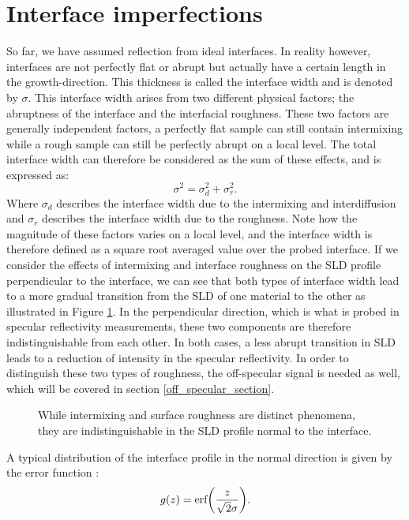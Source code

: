 \section{Interface imperfections}\label{interface_imperfections}
So far, we have assumed reflection from ideal interfaces. In reality however, interfaces are not perfectly flat or abrupt but actually have a certain length in the growth-direction. This thickness is called the interface width and is denoted by $\sigma$. This interface width arises from two different physical factors; the abruptness of the interface and the interfacial roughness. These two factors are generally independent factors, a perfectly flat sample can still contain intermixing while a rough sample can still be perfectly abrupt on a local level. The total interface width can therefore be considered as the sum of these effects, and is expressed as:
\begin{equation}
	\sigma^2 = \sigma_ d^2 + \sigma_r^2.
\end{equation}
Where $\sigma_d$ describes the interface width due to the intermixing and interdiffusion and $\sigma_r$ describes the interface width due to the roughness. Note how the magnitude of these factors varies on a local level, and the interface width is therefore defined as a square root averaged value over the probed interface. If we consider the effects of intermixing and interface roughness on the SLD profile perpendicular to the interface, we can see that both types of interface width lead to a more gradual transition from the SLD of one material to the other as illustrated in Figure \ref{interfacewidthgradient}. In the perpendicular direction, which is what is probed in specular reflectivity measurements, these two components are therefore indistinguishable from each other. In both cases, a less abrupt transition in SLD leads to a reduction of intensity in the specular reflectivity. In order to distinguish these two types of roughness, the off-specular signal is needed as well, which will be covered in section \ref{off_specular_section}.  
\begin{figure}
	\centering
	\def\svgwidth{\textwidth}
	
	\caption{While intermixing and surface roughness are distinct phenomena, they are indistinguishable in the SLD profile normal to the interface.}
	\label{interfacewidthgradient}
\end{figure}
A typical distribution of the interface profile in the normal direction is given by the error function \cite{nielsen_xray}:
\begin{equation}\label{errorfunction}
	g(z) = \textrm{erf}\qty(\frac{z}{\sqrt{2}\sigma}).
\end{equation}
